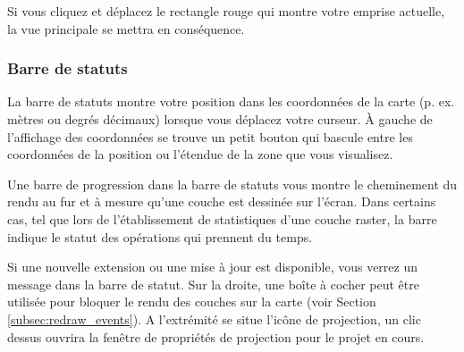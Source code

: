 Si vous cliquez et déplacez le rectangle rouge qui montre votre emprise actuelle, la vue principale se mettra en conséquence.

%
%
%

\subsubsection{Barre de statuts}\label{label_statusbar}

La barre de statuts montre votre position dans les coordonnées de la carte (p. ex. mètres ou degrés décimaux) lorsque vous déplacez votre curseur. À gauche de l'affichage des coordonnées se trouve un petit bouton qui bascule entre les coordonnées de la position ou l'étendue de la zone que vous visualisez.

Une barre de progression dans la barre de statuts vous montre le cheminement du rendu au fur et à mesure qu'une couche est dessinée sur l'écran. Dans certains cas, tel que lors de l'établissement de statistiques d'une couche raster, la barre indique le statut des opérations qui prennent du temps.

Si une nouvelle extension ou une mise à jour est disponible, vous verrez un message dans la barre de statut. Sur la droite, une boîte à cocher peut être utilisée pour bloquer le rendu des couches sur la carte (voir Section \ref{subsec:redraw_events}). A l'extrémité se situe l'icône de projection,  un clic dessus ouvrira la fenêtre de propriétés de projection pour le projet en cours.


